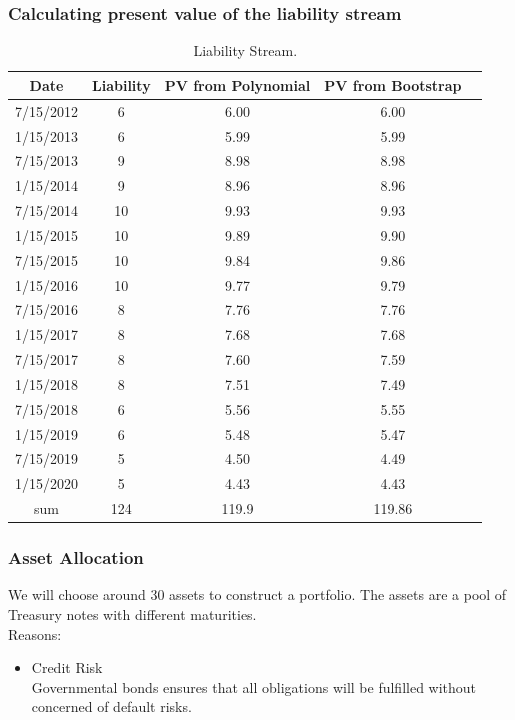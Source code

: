 \documentclass[compress,handout,10pt]{beamer}
\let\olditem\item
\renewcommand{\item}{\setlength{\itemsep}{0.5\baselineskip}\olditem}
\begin{document}
\begin{frame}
    \frametitle{Calculating present value of the liability stream}
\begin{table}[h]
\centering  
\begin{tabular}{ccccc}
\hline
Date  &Liability  &PV from Polynomial  &PV from Bootstrap\\ \hline  
7/15/2012  &6    &6.00                        &6.00                      \\
1/15/2013  &6    &5.99                      &5.99                  \\
7/15/2013  &9  &8.98                        &8.98                     \\
1/15/2014  &9  &8.96                       &8.96                     \\
7/15/2014  &10 &9.93                        &9.93                      \\
1/15/2015  &10 &9.89                        &9.90                     \\
7/15/2015  &10  &9.84                        &9.86                    \\
1/15/2016  &10  &9.77                        &9.79                      \\
7/15/2016  &8        &7.76                        &7.76                     \\                             
1/15/2017  &8      &7.68                        &7.68                     \\
7/15/2017  &8       &7.60                       &7.59                      \\
1/15/2018  &8       &7.51                       &7.49                     \\
7/15/2018  &6    &5.56                        &5.55                     \\ 
1/15/2019  &6      &5.48                       &5.47                     \\ 
7/15/2019  &5      &4.50                        &4.49                      \\ 
1/15/2020  &5       &4.43                       &4.43                      \\ \hline
sum       &124           &119.9                    &119.86

\end{tabular}
\caption{Liability Stream.}
\end{table}
\end{frame}

\begin{frame}
    \frametitle{Asset Allocation}
We will choose around 30 assets to construct a portfolio. The assets are a pool of Treasury notes with different maturities. \\
\vspace{3mm}
Reasons:\\
\vspace{3mm}
\begin{itemize}
\item Credit Risk \\
Governmental bonds ensures that all obligations will be fulfilled without concerned of default risks. 
\end{itemize}
\end{frame}
\end{document}

